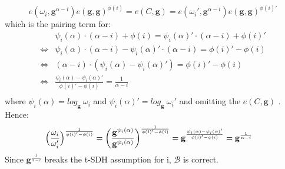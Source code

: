 $$e(\omega_i,\mathbf{g}^{\alpha-i})e(\mathbf{g}, \mathbf{g})^{\phi(i)} = e(C,\mathbf{g}) = e(\omega_i',\mathbf{g}^{\alpha-i})e(\mathbf{g}, \mathbf{g})^{\phi(i)'}$$
which is the pairing term for: 
\begin{equation*}
    \begin{aligned}
        &\psi_i(\alpha) \cdot (\alpha-i) + \phi(i) = \psi_i(\alpha)' \cdot (\alpha-i) + \phi(i)' \\
        \iff&  \psi_i(\alpha) \cdot (\alpha-i) - \psi_i(\alpha)' \cdot (\alpha-i) = \phi(i)' - \phi(i)\\
        \iff& (\alpha-i)  \cdot (\psi_i(\alpha) - \psi_i(\alpha)') = \phi(i)' - \phi(i)\\
        \iff& \frac{\psi_i(\alpha) - \psi_i(\alpha)'}{\phi(i)' - \phi(i)} = \frac{1}{\alpha - i}\\
    \end{aligned}
\end{equation*}
where $\psi_i(\alpha)= log_{\mathbf{g}}\ \omega_i$ and $\psi_i(\alpha)'= log_{\mathbf{g}}\ \omega_i'$ and omitting the $e(C,\mathbf{g})$
\parencite{KZG}.
Hence: 
\begin{equation*}
    \begin{aligned}
        &\Bigl(\frac{\omega_i}{\omega_i'}\Bigr)^{\frac{1}{\phi(i)'-\phi(i)}} 
        = \biggl(\frac{\mathbf{g}^{\psi_i(\alpha)}}{\mathbf{g}^{\psi_i(\alpha)}}\biggr)^{\frac{1}{\phi(i)'-\phi(i)}}
        = \mathbf{g}^{\frac{\psi_i(\alpha) - \psi_i(\alpha)'}{\phi(i)' - \phi(i)}}
        = \mathbf{g}^{\frac{1}{\alpha-i}}
    \end{aligned}
\end{equation*}
Since $\mathbf{g}^{\frac{1}{\alpha-i}}$ breaks the t-SDH assumption for i, $\mathcal{B}$ is correct.


